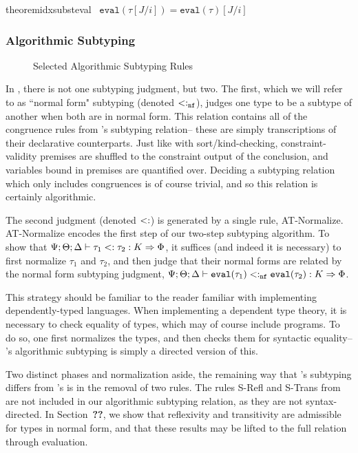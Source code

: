 \begin{restatable}{theorem}{idxsubsteval}
~$\texttt{eval}(\tau[J/i]) = \texttt{eval}(\tau)[J/i]$
\label{thm:idx-subst-eval}
\end{restatable}

\subsubsection{Algorithmic Subtyping}

\begin{figure}

\label{fig:bilambdaamor-selected-subty-rules}
\caption{Selected Algorithmic Subtyping Rules}
\end{figure}

In \bilambdaamor, there is not one subtyping judgment, but two. The first, which we will refer to as ``normal form" subtyping (denoted $<:_{\texttt{nf}}$),  judges one type to be a subtype of another when both are in normal form. This relation contains all of the congruence rules from \dlambdaamor's subtyping relation-- these are simply transcriptions of their declarative counterparts. Just like with sort/kind-checking, constraint-validity premises are shuffled to the constraint output of the conclusion, and variables bound in premises are quantified over. Deciding a subtyping relation which only includes congruences is of course trivial, and so this relation is certainly algorithmic.

The second judgment (denoted $<:$) is generated by a single rule, AT-Normalize. AT-Normalize encodes the first step of our two-step subtyping algorithm.
To show that $\Psi ; \Theta ; \Delta \vdash \tau_1 <: \tau_2 : K \Rightarrow \Phi$, it suffices (and indeed it is necessary) to first normalize $\tau_1$ and $\tau_2$, and then judge that their normal forms are related by the normal form subtyping judgment, $\Psi ; \Theta ; \Delta \vdash \texttt{eval}(\tau_1) <:_{\texttt{nf}} \texttt{eval}(\tau_2) : K \Rightarrow \Phi$.
 
This strategy should be familiar to the reader familiar with implementing dependently-typed languages. When implementing a dependent type theory, it is necessary to check equality of types, which may of course include programs. To do so, one first normalizes the types, and then checks them for syntactic equality-- \bilambdaamor's algorithmic subtyping is simply a directed version of this.

Two distinct phases and normalization aside, the remaining way that \bilambdaamor's subtyping differs from \dlambdaamor's is in the removal of two rules. The rules S-Refl and S-Trans from \dlambdaamor are not included in our algorithmic subtyping relation, as they are not syntax-directed. In Section~\textbf{??}, we show that reflexivity and transitivity are admissible for types in normal form, and that these results may be lifted to the full relation through evaluation.


